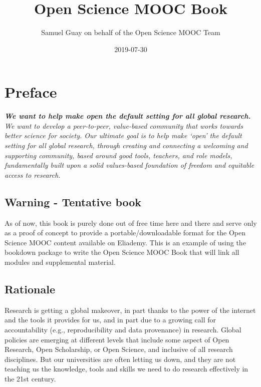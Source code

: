 \documentclass[]{book}
\title{Open Science MOOC Book}
\author{Samuel Guay on behalf of the Open Science MOOC Team}
\date{2019-07-30}
\begin{document}
\maketitle

{
\setcounter{tocdepth}{1}
\tableofcontents
}
\hypertarget{preface}{%
\chapter*{Preface}\label{preface}}

\textbf{\emph{We want to help make open the default setting for all global research.}} \emph{We want to develop a peer-to-peer, value-based community that works towards better science for society. Our ultimate goal is to help make `open' the default setting for all global research, through creating and connecting a welcoming and supporting community, based around good tools, teachers, and role models, fundamentally built upon a solid values-based foundation of freedom and equitable access to research.}

\hypertarget{warning---tentative-book}{%
\section*{Warning - Tentative book}\label{warning---tentative-book}}

As of now, this book is purely done out of free time here and there and serve only as a proof of concept to provide a portable/downloadable format for the Open Science MOOC content available on Eliademy. This is an example of using the bookdown package to write the Open Science MOOC Book that will link all modules and supplemental material.

\hypertarget{rationale}{%
\section*{Rationale}\label{rationale}}

Research is getting a global makeover, in part thanks to the power of the internet and the tools it provides for us, and in part due to a growing call for accountability (e.g., reproducibility and data provenance) in research. Global policies are emerging at different levels that include some aspect of Open Research, Open Scholarship, or Open Science, and inclusive of all research disciplines. But our universities are often letting us down, and they are not teaching us the knowledge, tools and skills we need to do research effectively in the 21st century.
\end{document}
